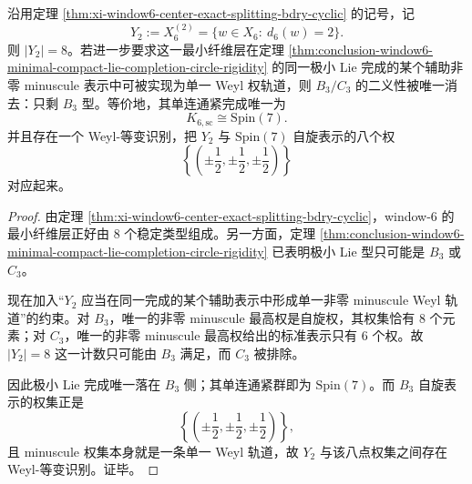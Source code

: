 \begin{theorem}\label{thm:conclusion-window6-minuscule-eightfold-b3-spin7}
沿用定理 \ref{thm:xi-window6-center-exact-splitting-bdry-cyclic} 的记号，记
\[
Y_2:=X_6^{(2)}=\{w\in X_6:\ d_6(w)=2\}.
\]
则 \(|Y_2|=8\)。若进一步要求这一最小纤维层在定理 \ref{thm:conclusion-window6-minimal-compact-lie-completion-circle-rigidity} 的同一极小 Lie 完成的某个辅助非零 minuscule 表示中可被实现为单一 Weyl 权轨道，则 \(B_3/C_3\) 的二义性被唯一消去：只剩 \(B_3\) 型。等价地，其单连通紧完成唯一为
\[
K_{6,\mathrm{sc}}\cong \mathrm{Spin}(7).
\]
并且存在一个 Weyl-等变识别，把 \(Y_2\) 与 \(\mathrm{Spin}(7)\) 自旋表示的八个权
\[
\left\{
\left(\pm\frac12,\pm\frac12,\pm\frac12\right)
\right\}
\]
对应起来。
\end{theorem}
\begin{proof}
由定理 \ref{thm:xi-window6-center-exact-splitting-bdry-cyclic}，window-\(6\) 的最小纤维层正好由 \(8\) 个稳定类型组成。另一方面，定理 \ref{thm:conclusion-window6-minimal-compact-lie-completion-circle-rigidity} 已表明极小 Lie 型只可能是 \(B_3\) 或 \(C_3\)。

现在加入“\(Y_2\) 应当在同一完成的某个辅助表示中形成单一非零 minuscule Weyl 轨道”的约束。对 \(B_3\)，唯一的非零 minuscule 最高权是自旋权，其权集恰有 \(8\) 个元素；对 \(C_3\)，唯一的非零 minuscule 最高权给出的标准表示只有 \(6\) 个权。故 \(|Y_2|=8\) 这一计数只可能由 \(B_3\) 满足，而 \(C_3\) 被排除。

因此极小 Lie 完成唯一落在 \(B_3\) 侧；其单连通紧群即为 \(\mathrm{Spin}(7)\)。而 \(B_3\) 自旋表示的权集正是
\[
\left\{
\left(\pm\frac12,\pm\frac12,\pm\frac12\right)
\right\},
\]
且 minuscule 权集本身就是一条单一 Weyl 轨道，故 \(Y_2\) 与该八点权集之间存在 Weyl-等变识别。证毕。
\end{proof}

